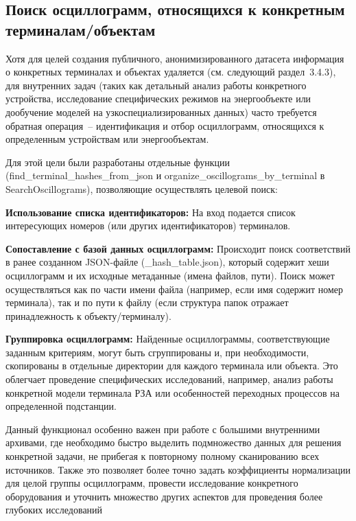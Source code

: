 \subsection{Поиск осциллограмм, относящихся к конкретным терминалам/объектам}\label{sec:ch3_terminal_search}

Хотя для целей создания публичного, анонимизированного датасета информация о конкретных
терминалах и объектах удаляется (см. следующий раздел~3.4.3), для внутренних задач
(таких как детальный анализ работы конкретного устройства, исследование специфических
режимов на энергообъекте или дообучение моделей на узкоспециализированных данных) часто
требуется обратная операция~-- идентификация и отбор осциллограмм, относящихся к
определенным устройствам или энергообъектам.\par\vspace{0.2cm}

Для этой цели были разработаны отдельные функции (find\_terminal\_hashes\_from\_json и
organize\_oscillograms\_by\_terminal в SearchOscillograms), позволяющие осуществлять
целевой поиск:\par\vspace{0.2cm}

\textbf{Использование списка идентификаторов:} На вход подается список интересующих номеров (или других идентификаторов) терминалов.\par\vspace{0.2cm}

\textbf{Сопоставление с базой данных осциллограмм:} Происходит поиск соответствий в ранее созданном JSON-файле (\_hash\_table.json), который содержит хеши осциллограмм и их исходные метаданные (имена файлов, пути). Поиск может осуществляться как по части имени файла (например, если имя содержит номер терминала), так и по пути к файлу (если структура папок отражает принадлежность к объекту/терминалу).\par\vspace{0.2cm}

\textbf{Группировка осциллограмм:} Найденные осциллограммы, соответствующие заданным критериям, могут быть сгруппированы и, при необходимости, скопированы в отдельные директории для каждого терминала или объекта. Это облегчает проведение специфических исследований, например, анализ работы конкретной модели терминала РЗА или особенностей переходных процессов на определенной подстанции.\par\vspace{0.2cm}

Данный функционал особенно важен при работе с большими внутренними архивами, где
необходимо быстро выделить подмножество данных для решения конкретной задачи, не
прибегая к повторному полному сканированию всех источников. Также это позволяет более
точно задать коэффициенты нормализации для целой группы осциллограмм, провести
исследование конкретного оборудования и уточнить множество других аспектов для
проведения более глубоких исследований\par\vspace{0.2cm}


